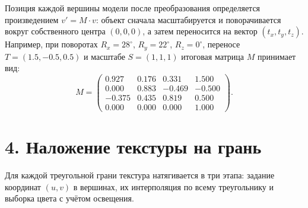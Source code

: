 \documentclass[11pt,a4paper]{article}
\begin{document}
Позиция каждой вершины модели после преобразования определяется произведением $v' = M \cdot v$: объект сначала масштабируется и поворачивается вокруг собственного центра $(0, 0, 0)$, а затем переносится на вектор $(t_x, t_y, t_z)$. Например, при поворотах $R_x = 28^\circ$, $R_y = 22^\circ$, $R_z = 0^\circ$, переносе $T = (1.5, -0.5, 0.5)$ и масштабе $S = (1, 1, 1)$ итоговая матрица $M$ принимает вид:
\begin{equation}
    M = \begin{pmatrix}
        0.927 & 0.176 & 0.331 & 1.500 \\
        0.000 & 0.883 & -0.469 & -0.500 \\
        -0.375 & 0.435 & 0.819 & 0.500 \\
        0.000 & 0.000 & 0.000 & 1.000
    \end{pmatrix}.
\end{equation}

\newpage

\section*{4. Наложение текстуры на грань}
Для каждой треугольной грани текстура натягивается в три этапа: задание координат $(u, v)$ в вершинах, их интерполяция по всему треугольнику и выборка цвета с учётом освещения.
\end{document}
